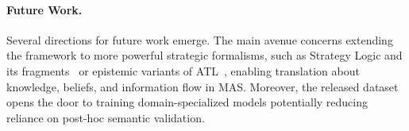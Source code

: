\paragraph{Future Work.}
Several directions for future work emerge. The main avenue concerns extending the framework to more powerful strategic formalisms, such as Strategy Logic and its fragments~\cite{DBLP:journals/tocl/MogaveroMPV14,DBLP:conf/aaai/CermakLM15,DBLP:conf/ijcai/BelardinelliJKM19} or epistemic variants of ATL~\cite{DBLP:journals/fuin/JamrogaH04,aminof2016prompt,jamroga2017reasoning}, enabling translation about knowledge, beliefs, and information flow in MAS. Moreover, the released dataset opens the door to training domain-specialized models potentially reducing reliance on post-hoc semantic validation.

